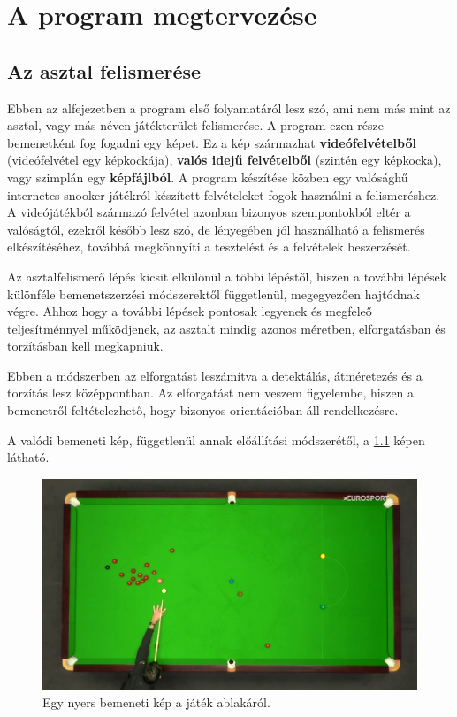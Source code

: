 \chapter{A program megtervezése}
\label{chapter:program_tervezes}
\section{Az asztal felismerése}

Ebben az alfejezetben a program első folyamatáról lesz szó, ami nem más mint az asztal, vagy más néven játékterület felismerése. A program ezen része bemenetként fog fogadni egy képet. Ez a kép származhat \textbf{videófelvételből} (videófelvétel egy képkockája), \textbf{valós idejű felvételből} (szintén egy képkocka), vagy szimplán egy \textbf{képfájlból}. A program készítése közben egy valósághű internetes snooker játékról\cite{flyordie} készített felvételeket fogok használni a felismeréshez. A videójátékból származó felvétel azonban bizonyos szempontokból eltér a valóságtól, ezekről később lesz szó, de lényegében jól használható a felismerés elkészítéséhez, továbbá megkönnyíti a tesztelést és a felvételek beszerzését.
\par Az asztalfelismerő lépés kicsit elkülönül a többi lépéstől, hiszen a további lépések különféle bemenetszerzési módszerektől függetlenül, megegyezően hajtódnak végre. Ahhoz hogy a további lépések pontosak legyenek és megfeleő teljesítménnyel működjenek, az asztalt mindig azonos méretben, elforgatásban és torzításban kell megkapniuk.
\par Ebben a módszerben az elforgatást leszámítva a detektálás, átméretezés és a torzítás lesz középpontban. Az elforgatást nem veszem figyelembe, hiszen a bemenetről feltételezhető, hogy bizonyos orientációban áll rendelkezésre.

\par A valódi bemeneti kép, függetlenül annak előállítási módszerétől, a \ref{fig:bemeneti_kep} képen látható.

\begin{figure}[!ht]
    \centering
    \includegraphics[width=115mm, keepaspectratio]{figures/input_screen.png}
    \caption{Egy nyers bemeneti kép a játék ablakáról.}
    \label{fig:bemeneti_kep}
\end{figure}

